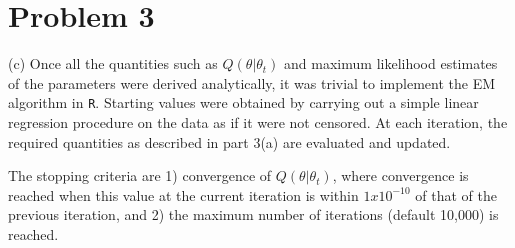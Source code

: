\documentclass{article}\usepackage[]{graphicx}\usepackage[]{color}
\begin{document}
\section{Problem 3}
(c)
Once all the quantities such as $Q(\theta|\theta_t)$ and maximum likelihood estimates of the parameters were derived analytically, it was trivial to implement the EM algorithm in \texttt{R}. Starting values were obtained by carrying out a simple linear regression procedure on the data as if it were not censored. At each iteration, the required quantities as described in part 3(a) are evaluated and updated.

The stopping criteria are 1) convergence of $Q(\theta|\theta_t)$, where convergence is reached when this value at the current iteration is within $1x10^{-10}$ of that of the previous iteration, and 2) the maximum number of iterations (default 10,000) is reached.
\end{document}

